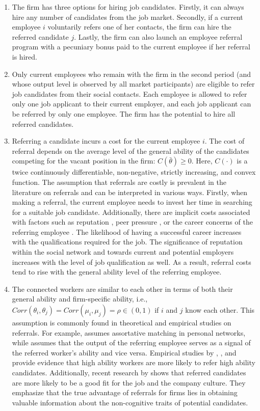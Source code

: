 \documentclass[12pt]{article}
\begin{document}
\begin{enumerate}[label={A}{\arabic*}., resume]
    \item The firm has three options for hiring job candidates. Firstly, it can always hire any number of candidates from the job market. Secondly, if a current employee $i$ voluntarily refers one of her contacts, the firm can hire the referred candidate $j$. Lastly, the firm can also launch an employee referral program with a pecuniary bonus paid to the current employee if her referral is hired.
    \item Only current employees who remain with the firm in the second period (and whose output level is observed by all market participants) are eligible to refer job candidates from their social contacts. Each employee is allowed to refer only one job applicant to their current employer, and each job applicant can be referred by only one employee. The firm has the potential to hire all referred candidates.
    \item Referring a candidate incurs a cost for the current employee $i$. The cost of referral depends on the average level of the general ability of the candidates competing for the vacant position in the firm: $C(\bar{\theta}) \geq 0$. Here, $C(\cdot)$ is a twice continuously differentiable, non-negative, strictly increasing, and convex function. The assumption that referrals are costly is prevalent in the literature on referrals and can be interpreted in various ways. Firstly, when making a referral, the current employee needs to invest her time in searching for a suitable job candidate. Additionally, there are implicit costs associated with factors such as reputation \citep{saloner1985old}, peer pressure \citep{kugler2003employee, heath2018firms}, or the career concerns of the referring employee \citep{ekinci2016employee}. The likelihood of having a successful career increases with the qualifications required for the job. The significance of reputation within the social network and towards current and potential employers increases with the level of job qualification as well. As a result, referral costs tend to rise with the general ability level of the referring employee.
    \item The connected workers are similar to each other in terms of both their general ability and firm-specific ability, i.e., $Corr(\theta_{i},\theta_{j}) = Corr(\mu_{i},\mu_{j})= \rho \in (0,1)$ if $i$ and $j$ know each other. This assumption is commonly found in theoretical and empirical studies on referrals. For example, \cite{montgomery1991social} assumes assortative matching in personal networks, while \cite{ekinci2016employee} assumes that the output of the referring employee serves as a signal of the referred worker's ability and vice versa. Empirical studies by \cite{beaman2012gets}, \cite{burks2015value}, and \cite{lalanne2021social} provide evidence that high ability workers are more likely to refer high ability candidates. Additionally, recent research by \cite{black2020network} shows that referred candidates are more likely to be a good fit for the job and the company culture. They emphasize that the true advantage of referrals for firms lies in obtaining valuable information about the non-cognitive traits of potential candidates.

\end{enumerate}
\end{document}
